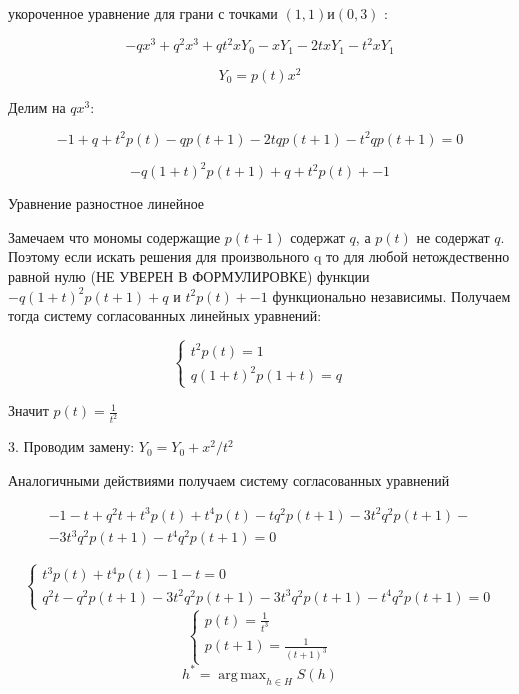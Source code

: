 \documentclass{article}
\DeclareMathOperator*{\argmax}{arg\,max}
\begin{document}
	укороченное уравнение для грани с точками $ (1,1) и (0,3)$ :
	
	$$ -q x^3 + q^2 x^3 + q t^2 x Y_0 - x Y_1 - 2 t x Y_1 - t^2 x Y_1   $$
	
	$$Y_0 = p(t)x^2$$
	
	Делим на $ q x^3$:
	
	$$ -1 + q + t^2 p(t) - q p (t+1) - 2 t q p(t+1) - t^2 q p(t+1) = 0  $$
	
	$$ -q (1+t)^2 p(t+1) + q + t^2 p(t) + -1 $$
	
	Уравнение разностное линейное
	
	Замечаем что мономы содержащие $p(t+1)$ содержат $q$, а $p(t)$ не содержат $q$. Поэтому если  искать решения для произвольного q то 
	для любой нетождественно равной нулю (НЕ УВЕРЕН В ФОРМУЛИРОВКЕ) функции $-q (1+t)^2 p(t+1) + q$ и $t^2 p(t) + -1$ функционально независимы. Получаем тогда систему согласованных линейных уравнений:
	
$$	
	\begin{cases}
		t^2 p(t) = 1\\
		q (1+t)^2 p(1+t) = q
	\end{cases}
$$
	
	Значит  $p(t)= \frac{1}{t^2}$
	
	3. Проводим замену: $Y_0 = Y_0 + x^2/t^2$
	
	
	Аналогичными действиями получаем систему согласованных уравнений

	\begin{multline}
		-1 -t + q^2 t + t^3 p(t) + t^4 p(t) - t q^2 p(t+1) - 3 t^2 q^2 p(t+1)-\\
		- 3t^3 q^2 p(t+1) - t^4 q^2 p(t+1) = 0
	\end{multline}


$$
	\begin{cases}
		t^3p(t) + t^4 p(t) - 1 -t = 0\\
		q^2 t - q^2 p(t+1) - 3 t^2 q^2 p(t+1) - 3 t^3 q^2 p(t+1) - t^4 q^2 p(t+1) =0
	\end{cases}
$$
$$
	\begin{cases}
		p(t) = \frac{1}{t^3}\\
		p(t+1) = \frac{1}{(t+1)^3}
	\end{cases}
$$
	$$h^*=\argmax_{h\in H}S(h)$$
	
	
\end{document}
